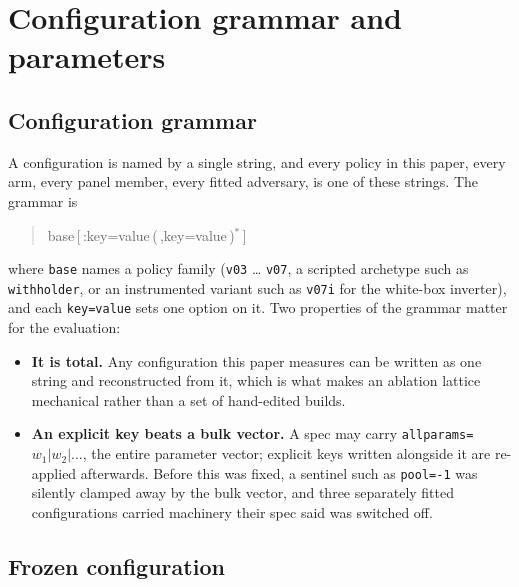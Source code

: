 \section{Configuration grammar and parameters}
\label{app:parameters}

\subsection*{Configuration grammar}

A configuration is named by a single string, and every policy in this paper, every arm, every
panel member, every fitted adversary, is one of these strings. The grammar is

\begin{quote}\ttfamily
base\,\textup{[}\,:key=value\,\textup{(}\,,key=value\,\textup{)}$^{*}$\,\textup{]}
\end{quote}

\noindent
where \texttt{base} names a policy family (\texttt{v03} \ldots{} \texttt{v07}, a scripted archetype
such as \texttt{withholder}, or an instrumented variant such as \texttt{v07i} for the white-box
inverter), and each \texttt{key=value} sets one option on it. Two properties of the grammar matter for the evaluation:

\begin{itemize}
\item \textbf{It is total.} Any configuration this paper measures can be written as one string and
      reconstructed from it, which is what makes an ablation lattice mechanical rather than a set of
      hand-edited builds.
\item \textbf{An explicit key beats a bulk vector.} A spec may carry
      \texttt{allparams=$w_1|w_2|\ldots$}, the entire parameter vector; explicit keys written
      alongside it are re-applied afterwards. Before this was fixed, a sentinel such as
      \texttt{pool=-1} was silently clamped away by the bulk vector, and three separately fitted
      configurations carried machinery their spec said was switched off.
\end{itemize}

\subsection*{Frozen configuration}

\begin{quote}\small\ttfamily\raggedright
\vsevenFrozenSpecWrapped{}
\end{quote}

